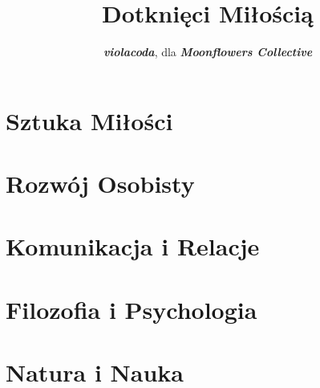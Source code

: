 \documentclass[]{coda-art}
\title{Dotknięci Miłością}
\author{\textbf{\emph{violacoda}}, dla \textbf{\emph{Moonflowers Collective}}}
\begin{document}


\twocolumn\tableofcontents

\onecolumn\clearpage
\pagestyle{fancy}



\clearpage\thispagestyle{akt}

\part{Sztuka Miłości}
\label{sztuka}






\clearpage\thispagestyle{akt}

\part{Rozwój Osobisty}
\label{akt:rozwoj}






\newpage\thispagestyle{akt}

\part{Komunikacja i Relacje}
\label{akt:komunikacja}






\clearpage\thispagestyle{akt}

\part{Filozofia i Psychologia}
\label{akt:filozofia}






\clearpage\thispagestyle{akt}

\part{Natura i Nauka}
\label{akt:natura}
\end{document}
